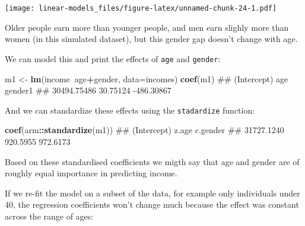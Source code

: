 \documentclass[]{article}
\newenvironment{Shaded}{\begin{snugshade}}{\end{snugshade}}
\newcommand{\KeywordTok}[1]{\textcolor[rgb]{0.13,0.29,0.53}{\textbf{#1}}}
\newcommand{\DataTypeTok}[1]{\textcolor[rgb]{0.13,0.29,0.53}{#1}}
\newcommand{\DecValTok}[1]{\textcolor[rgb]{0.00,0.00,0.81}{#1}}
\newcommand{\StringTok}[1]{\textcolor[rgb]{0.31,0.60,0.02}{#1}}
\newcommand{\OperatorTok}[1]{\textcolor[rgb]{0.81,0.36,0.00}{\textbf{#1}}}
\newcommand{\NormalTok}[1]{#1}
\theoremstyle{definition}
\theoremstyle{definition}
\theoremstyle{definition}
\theoremstyle{remark}
\begin{document}
\texttt{[image: linear-models\_files/figure-latex/unnamed-chunk-24-1.pdf]}

Older people earn more than younger people, and men earn slighly more
than women (in this simulated dataset), but this gender gap doesn't
change with age.

We can model this and print the effects of \texttt{age} and
\texttt{gender}:

\begin{Shaded}
\begin{Highlighting}[]
\NormalTok{m1 <-}\StringTok{ }\KeywordTok{lm}\NormalTok{(income}\OperatorTok{~}\NormalTok{age}\OperatorTok{+}\NormalTok{gender, }\DataTypeTok{data=}\NormalTok{incomes)}
\KeywordTok{coef}\NormalTok{(m1)}
\NormalTok{## (Intercept)         age     gender1 }
\NormalTok{## 30494.75486    30.75124  -486.30867}
\end{Highlighting}
\end{Shaded}

And we can standardize these effects using the \texttt{stadardize}
function:

\begin{Shaded}
\begin{Highlighting}[]
\KeywordTok{coef}\NormalTok{(arm}\OperatorTok{::}\KeywordTok{standardize}\NormalTok{(m1))}
\NormalTok{## (Intercept)       z.age    c.gender }
\NormalTok{##  31727.1240    920.5955    972.6173}
\end{Highlighting}
\end{Shaded}

Based on these standardised coefficients we migth say that age and
gender are of roughly equal importance in predicting income.

If we re-fit the model on a subset of the data, for example only
individuals under 40, the regression coefficients won't change much
because the effect was constant across the range of ages:

\begin{Shaded}
\end{Shaded}
\end{document}
